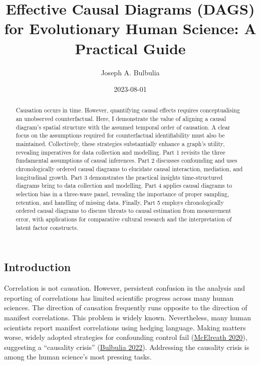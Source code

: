 \documentclass[
  singlecolumn]{article}
\title{Effective Causal Diagrams (DAGS) for Evolutionary Human Science:
A Practical Guide}
\author{Joseph A. Bulbulia}
\affil{%
                  Victoria University of Wellington, New Zealand, School
                  of Psychology, Centre for Applied Cross-Cultural
                  Research
              }
\date{2023-08-01}
\begin{document}
\maketitle
\begin{abstract}
Causation occurs in time. However, quantifying causal effects requires
conceptualising an unobserved counterfactual. Here, I demonstrate the
value of aligning a causal diagram's spatial structure with the assumed
temporal order of causation. A clear focus on the assumptions required
for counterfactual identifiability must also be maintained.
Collectively, these strategies substantially enhance a graph's utility,
revealing imperatives for data collection and modelling. Part 1 revisits
the three fundamental assumptions of causal inferences. Part 2 discusses
confounding and uses chronologically ordered causal diagrams to
elucidate causal interaction, mediation, and longitudinal growth. Part 3
demonstrates the practical insights time-structured diagrams bring to
data collection and modelling. Part 4 applies causal diagrams to
selection bias in a three-wave panel, revealing the importance of proper
sampling, retention, and handling of missing data. Finally, Part 5
employs chronologically ordered causal diagrams to discuss threats to
causal estimation from measurement error, with applications for
comparative cultural research and the interpretation of latent factor
constructs.
\end{abstract}
\ifdefined\Shaded\renewenvironment{Shaded}{\begin{tcolorbox}[breakable, sharp corners, boxrule=0pt, frame hidden, interior hidden, enhanced, borderline west={3pt}{0pt}{shadecolor}]}{\end{tcolorbox}}\fi

\hypertarget{introduction}{%
\subsection{Introduction}\label{introduction}}

Correlation is not causation. However, persistent confusion in the
analysis and reporting of correlations has limited scientific progress
across many human sciences. The direction of causation frequently runs
opposite to the direction of manifest correlations. This problem is
widely known. Nevertheless, many human scientists report manifest
correlations using hedging language. Making matters worse, widely
adopted strategies for confounding control fail
(\protect\hyperlink{ref-mcelreath2020}{McElreath 2020}), suggesting a
``causality crisis'' (\protect\hyperlink{ref-bulbulia2022}{Bulbulia
2022}). Addressing the causality crisis is among the human science's
most pressing tasks.
\end{document}
